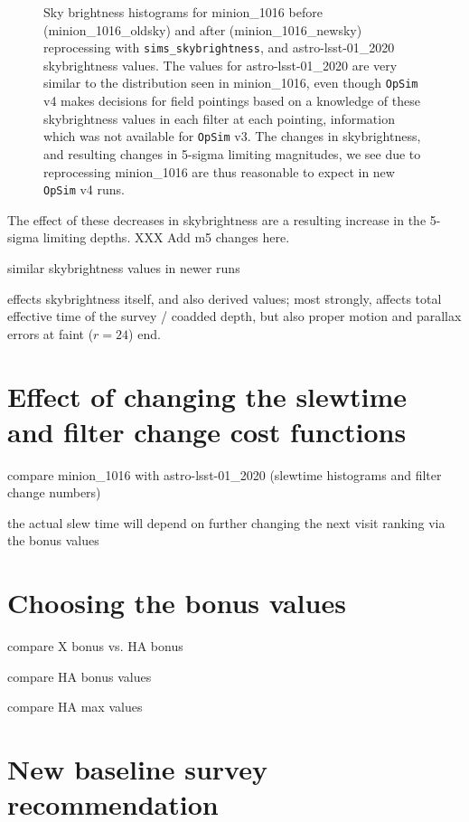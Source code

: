 \documentclass[DM,lsstdraft,authoryear,toc]{lsstdoc}
\newcommand{\opsim}{\texttt{OpSim}\xspace}
\newcommand{\simsky}{\texttt{sims\_skybrightness}\xspace}
\begin{document}
\begin{figure}[ht]
\caption{Sky brightness histograms for minion\_1016 before (minion\_1016\_oldsky) and after (minion\_1016\_newsky) reprocessing with \simsky, and astro-lsst-01\_2020 skybrightness values. The values for astro-lsst-01\_2020 are very similar to the distribution seen in minion\_1016, even though \opsim v4 makes decisions for field pointings based on a knowledge of these skybrightness values in each filter at each pointing, information which was not available for \opsim v3. The changes in skybrightness, and resulting changes in 5-sigma limiting magnitudes, we see due to reprocessing minion\_1016 are thus reasonable to expect in new \opsim v4 runs.
\label{fig:skybrightness}}
\end{figure}

The effect of these decreases in skybrightness are a resulting increase in the 5-sigma limiting depths. 
XXX Add m5 changes here.

similar skybrightness values in newer runs



effects skybrightness itself, and also derived values; most strongly, affects total effective time of the survey / coadded depth, but also proper motion and parallax errors at faint ($r=24$) end.

\section{Effect of changing the slewtime and filter change cost functions}

compare minion\_1016 with astro-lsst-01\_2020 (slewtime histograms and filter change numbers)

the actual slew time will depend on further changing the next visit ranking via the bonus values

\section{Choosing the bonus values} 

compare X bonus vs. HA bonus

compare HA bonus values
 
compare HA max values



\section{New baseline survey recommendation}
\end{document}

